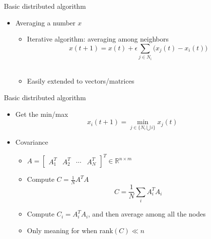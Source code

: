 \documentclass[12pt]{beamer}
\begin{document}
\begin{frame}{Basic distributed algorithm}
    \begin{itemize}
        \item Averaging a number $x$
        \begin{itemize}
            \item Iterative algorithm: averaging among neighbors
            \[x(t+1) = x(t) + \epsilon \sum_{j \in N_i} \Big(x_j(t) - x_i(t)\Big)\]
            \\  
            \item Easily extended to vectors/matrices
        \end{itemize}
    \end{itemize}
\end{frame}

\begin{frame}{Basic distributed algorithm}
    \begin{itemize}
        \item Get the min/max
        \[x_i(t+1) = \min_{j \in \{N_i \bigcup i\}} x_j(t)\]
        \item Covariance
        \begin{itemize}
            \item $A = \begin{bmatrix}A_1^T & A_2^T & \cdots & A_N^T\end{bmatrix}^T \in \mathbb{R}^{n \times m}$
            \item Compute $C = \frac{1}{N}A^TA$
            \[C = \frac{1}{N}\sum_iA_i^TA_i\]
            \item Compute $C_i = A_i^TA_i$, and then average among all the nodes
            \item Only meaning for when rank$(C) \ll n$
        \end{itemize}
    \end{itemize}
\end{frame}
\end{document}
